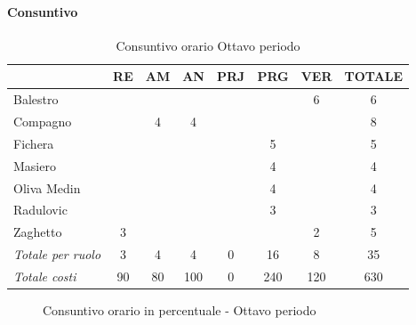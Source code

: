 \documentclass[a4paper,12pt]{article}
\begin{document}
            \paragraph{Consuntivo}
                \begin{table}[H]
                \centering
                \caption{Consuntivo orario Ottavo periodo}
                \begin{tabular}{|l|c|c|c|c|c|c|c|}
                \hline
                    \rowcolor{lightgray}{\textbf{Membro}} & {\textbf{RE}} & {\textbf{AM}} & {\textbf{AN}} & {\textbf{PRJ}} & {\textbf{PRG}} & {\textbf{VER}} & {\textbf{TOTALE}}\\
                \hline
                    Balestro & & & & & & 6 & 6\\
                \hline
                    Compagno & & 4 & 4 & & & & 8\\
                \hline
                    Fichera & & & & & 5 & & 5\\
                \hline
                    Masiero & & & & & 4 & & 4\\
                \hline
                    Oliva Medin & & & & & 4 & & 4\\
                \hline
                    Radulovic & & & & & 3 & & 3\\
                \hline
                    Zaghetto & 3 & & & & & 2 & 5\\
                \hline
                    \rowcolor{lightgray}\textit{Totale per ruolo} & 3 & 4 & 4 & 0 & 16 & 8 & 35\\
                \hline
                    \rowcolor{lightgray}\textit{Totale costi} & 90 & 80 & 100 & 0 & 240 & 120 & 630\\
                \hline
                \end{tabular}
                \end{table}

                \begin{figure}[H]
                \centering
                \caption{Consuntivo orario in percentuale - Ottavo periodo}
                \end{figure}
                
\end{document}
